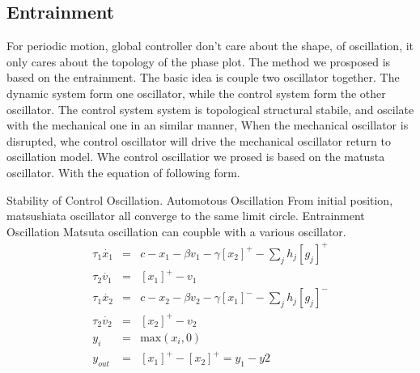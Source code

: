 \subsection{Entrainment}
For periodic motion, global controller don’t care about the shape, of oscillation, it only cares about the topology of the phase plot.
The method we prosposed is based on the entrainment.
The basic idea is couple two oscillator together. The dynamic system form one oscillator, while the control system form the other oscillator.
The control system system is topological structural stabile, and oscilate with the mechanical one in an similar manner,
When the mechanical oscillator is disrupted, whe control oscillator will drive the mechanical oscillator return to oscillation model.
Whe control oscillatior we prosed is based on the matusta oscillator.
With the equation of following form.


Stability of Control Oscillation.
Automotous Oscillation
From initial position, matsushiata oscillator all converge to the same limit circle.
Entrainment Oscillation
Matsuta oscillation can coupble with a various oscillator.
\begin{eqnarray}
\tau_{1} \dot{x_{1}}&=&c-x_{1}-\beta v_{1}-\gamma [x_{2}]^{+}-\sum_{j}h_{j}[g_{j}]^{+}\\
\tau_{2} \dot{v_{1}}&=&[x_{1}]^{+}-v_{1}\\
\tau_{1} \dot{x_{2}}&=&c-x_{2}-\beta v_{2}-\gamma [x_{1}]^{-}-\sum_{j}h_{j}[g_{j}]^{-}\\
\tau_{2} \dot{v_{2}}&=&[x_{2}]^{+}-v_{2}\\
y_{i}&=&\mbox{max}(x_{i},0)\\
y_{out}&=&[x_{1}]^{+}-[x_{2}]^{+}=y_{1}-y{2}
\label{eq:matsuta}
\end{eqnarray}